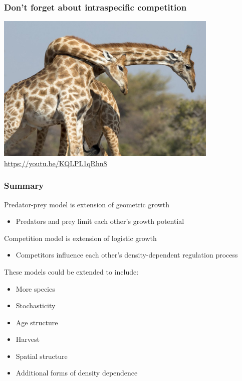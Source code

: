 \documentclass[color=usenames,dvipsnames]{beamer}\usepackage[]{graphicx}\usepackage[]{xcolor}
\begin{document}
\begin{frame}
  \frametitle{Don't forget about intraspecific competition}
  \centering 
  \includegraphics[width=0.8\textwidth]{figs/giraffe} \\
  \url{
    https://youtu.be/KQLPL1qRhn8
  }
\end{frame}


\begin{frame}
  \frametitle{Summary}
  \large
  Predator-prey model is extension of geometric growth
    \begin{itemize}
      \item Predators and prey limit each other's growth potential
    \end{itemize}
    \pause \vfill
    Competition model is extension of logistic growth
    \begin{itemize}
      \item Competitors influence each other's density-dependent
        regulation process
    \end{itemize}
    \pause \vfill
    These models could be extended to include:
    \begin{itemize}%
    \item More species
    \item Stochasticity
    \item Age structure
    \item Harvest
    \item Spatial structure
    \item Additional forms of density dependence
    \end{itemize}
\end{frame}
\end{document}
